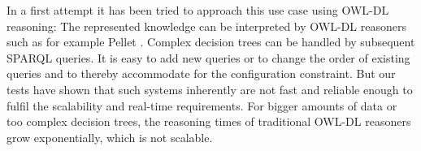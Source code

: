In a first attempt it has been tried to approach this use case using OWL-DL reasoning:
The represented knowledge can be interpreted by OWL-DL reasoners such as for example Pellet \cite{Pellet}. %
Complex decision trees can be handled by subsequent SPARQL queries. It is easy to add new queries or to change the order of existing queries 
and to thereby accommodate for the configuration constraint.
But our tests have shown that such systems inherently are not fast and reliable enough to fulfil the scalability and real-time requirements.
For bigger amounts of data or too complex decision trees, the reasoning times of traditional OWL-DL reasoners grow exponentially, which is not scalable.


 

